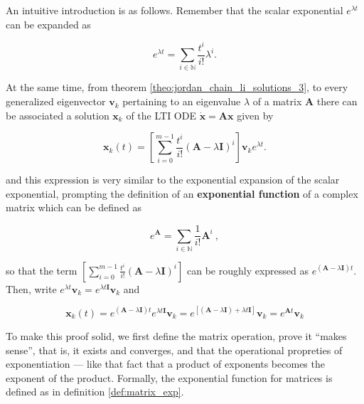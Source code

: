 	An intuitive introduction is as follows. Remember that the scalar exponential $e^{\lambda t}$ can be expanded as

\begin{equation} e^{\lambda t} = \sum\limits_{i\in\mathbb{N}} \dfrac{t^i}{i!} \lambda^i . \end{equation}

	At the same time, from theorem \ref{theo:jordan_chain_li_solutions_3}, to every generalized eigenvector $\mathbf{v}_k$ pertaining to an eigenvalue $\lambda$ of a matrix $\mathbf{A}$ there can be associated a solution $\mathbf{x}_k$ of the LTI ODE $\dot{\mathbf{x}} = \mathbf{Ax}$ given by

\begin{equation} \mathbf{x}_k(t) =  \left[\displaystyle\sum\limits_{i=0}^{m-1} \dfrac{t^i}{i!}\left(\mathbf{A} - \lambda\mathbf{I}\right)^{i}\right] \mathbf{v}_ke^{\lambda t}. \label{eq:matrix_exp_geneigen_solution_k}\end{equation}

	\noindent and this expression is very similar to the exponential expansion of the scalar exponential, prompting the definition of an \textbf{exponential function} of a complex matrix which can be defined as

\begin{equation} e^{\mathbf{A}} = \sum\limits_{i\in\mathbb{N}} \dfrac{1}{i!} \mathbf{A}^i\ , \label{eq:matrix_exp_def} \end{equation}

	\noindent so that the term $\left[\sum\limits_{i=0}^{m-1} \frac{t^i}{i!}\left(\mathbf{A} - \lambda\mathbf{I}\right)^{i}\right]$ can be roughly expressed as $e^{\left(\mathbf{A} - \lambda\mathbf{I}\right)t}$. Then, write $e^{\lambda t}\mathbf{v}_k = e^{\lambda t \mathbf{I}} \mathbf{v}_k$ and

\begin{equation} \mathbf{x}_k(t) = e^{\left(\mathbf{A} - \lambda\mathbf{I}\right)t} e^{\lambda t \mathbf{I}} \mathbf{v}_k = e^{\left[\left(\mathbf{A} - \lambda\mathbf{I}\right) + \lambda t \mathbf{I}\right]}\mathbf{v}_k =  e^{\mathbf{A}t}\mathbf{v}_k\end{equation}

	To make this proof solid, we first define the matrix operation, prove it ``makes sense'', that is, it exists and converges, and that the operational propreties of exponentiation — like that fact that a product of exponents becomes the exponent of the product. Formally, the exponential function for matrices is defined as in definition \ref{def:matrix_exp}.

